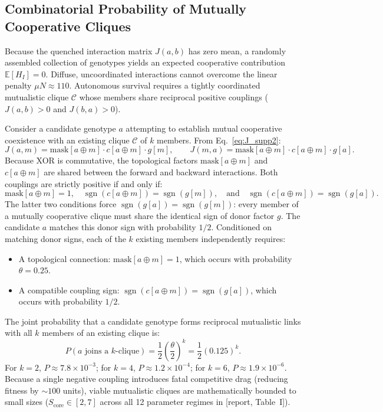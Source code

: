 \documentclass[11pt,a4paper]{article}
\newcommand{\R}[1]{\textcolor{blue!55!black}{[report, #1]}}
\begin{document}
\subsection{Combinatorial Probability of Mutually Cooperative Cliques}
\label{sec:clique}

Because the quenched interaction matrix $J(a,b)$ has zero mean, a randomly assembled collection of genotypes yields an expected cooperative contribution $\mathbb{E}[H_I] = 0$. Diffuse, uncoordinated interactions cannot overcome the linear penalty $\mu N \approx 110$. Autonomous survival requires a tightly coordinated mutualistic clique $\mathcal{C}$ whose members share reciprocal positive couplings ($J(a,b) > 0$ and $J(b,a) > 0$).

Consider a candidate genotype $a$ attempting to establish mutual cooperative coexistence with an existing clique $\mathcal{C}$ of $k$ members. From Eq.~\eqref{eq:J_supp2}:
\begin{equation}
J(a,m) = \mathrm{mask}[a \oplus m] \cdot c[a \oplus m] \cdot g[m], \qquad J(m,a) = \mathrm{mask}[a \oplus m] \cdot c[a \oplus m] \cdot g[a].
\end{equation}
Because XOR is commutative, the topological factors $\mathrm{mask}[a \oplus m]$ and $c[a \oplus m]$ are shared between the forward and backward interactions. Both couplings are strictly positive if and only if:
\begin{equation}
\mathrm{mask}[a \oplus m] = 1, \quad \operatorname{sgn}(c[a \oplus m]) = \operatorname{sgn}(g[m]), \quad \text{and} \quad \operatorname{sgn}(c[a \oplus m]) = \operatorname{sgn}(g[a]).
\end{equation}
The latter two conditions force $\operatorname{sgn}(g[a]) = \operatorname{sgn}(g[m])$: every member of a mutually cooperative clique must share the identical sign of donor factor $g$. The candidate $a$ matches this donor sign with probability $1/2$. Conditioned on matching donor signs, each of the $k$ existing members independently requires:
\begin{itemize}
\item A topological connection: $\mathrm{mask}[a \oplus m] = 1$, which occurs with probability $\theta = 0.25$.
\item A compatible coupling sign: $\operatorname{sgn}(c[a \oplus m]) = \operatorname{sgn}(g[a])$, which occurs with probability $1/2$.
\end{itemize}
The joint probability that a candidate genotype forms reciprocal mutualistic links with all $k$ members of an existing clique is:
\begin{equation}
\boxed{\;P(a \text{ joins a } k\text{-clique}) = \frac{1}{2} \left( \frac{\theta}{2} \right)^k = \frac{1}{2} (0.125)^k.\;}
\label{eq:clique_prob}
\end{equation}
For $k = 2$, $P \approx 7.8 \times 10^{-3}$; for $k = 4$, $P \approx 1.2 \times 10^{-4}$; for $k = 6$, $P \approx 1.9 \times 10^{-6}$. Because a single negative coupling introduces fatal competitive drag (reducing fitness by $\sim 100$ units), viable mutualistic cliques are mathematically bounded to small sizes ($S_{\mathrm{core}} \in [2, 7]$ across all 12 parameter regimes in \R{Table~I}).
\end{document}
